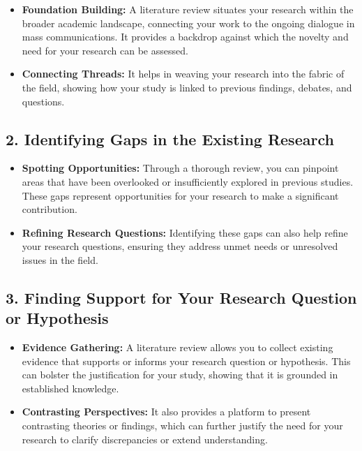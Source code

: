 \documentclass[
]{book}
\providecommand{\tightlist}{%
  \setlength{\itemsep}{0pt}\setlength{\parskip}{0pt}}
\begin{document}
\begin{itemize}
\tightlist
\item
  \textbf{Foundation Building:} A literature review situates your research within the broader academic landscape, connecting your work to the ongoing dialogue in mass communications. It provides a backdrop against which the novelty and need for your research can be assessed.
\item
  \textbf{Connecting Threads:} It helps in weaving your research into the fabric of the field, showing how your study is linked to previous findings, debates, and questions.
\end{itemize}

\hypertarget{identifying-gaps-in-the-existing-research}{%
\subsection*{2. Identifying Gaps in the Existing Research}\label{identifying-gaps-in-the-existing-research}}

\begin{itemize}
\tightlist
\item
  \textbf{Spotting Opportunities:} Through a thorough review, you can pinpoint areas that have been overlooked or insufficiently explored in previous studies. These gaps represent opportunities for your research to make a significant contribution.
\item
  \textbf{Refining Research Questions:} Identifying these gaps can also help refine your research questions, ensuring they address unmet needs or unresolved issues in the field.
\end{itemize}

\hypertarget{finding-support-for-your-research-question-or-hypothesis}{%
\subsection*{3. Finding Support for Your Research Question or Hypothesis}\label{finding-support-for-your-research-question-or-hypothesis}}

\begin{itemize}
\tightlist
\item
  \textbf{Evidence Gathering:} A literature review allows you to collect existing evidence that supports or informs your research question or hypothesis. This can bolster the justification for your study, showing that it is grounded in established knowledge.
\item
  \textbf{Contrasting Perspectives:} It also provides a platform to present contrasting theories or findings, which can further justify the need for your research to clarify discrepancies or extend understanding.
\end{itemize}
\end{document}
